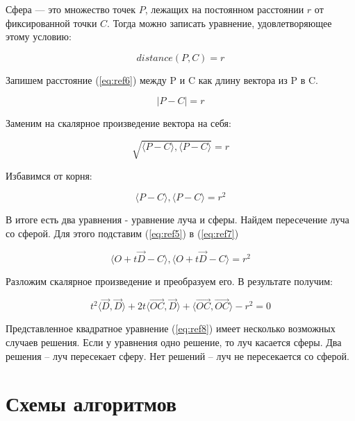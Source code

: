 Сфера — это множество точек $P$, лежащих на постоянном расстоянии $r$ от фиксированной точки $C$. Тогда можно записать уравнение, удовлетворяющее этому условию:

\begin{equation}
	distance(P,C) = r
	\label{eq:ref6}
\end{equation}

Запишем расстояние (\ref{eq:ref6}) между P и C как длину вектора из P в C.

\begin{equation}
	|P-C|=r
\end{equation}

Заменим на скалярное произведение вектора на себя:

\begin{equation}
	\sqrt{\langle P - C\rangle, \langle P - C\rangle} = r
\end{equation}

Избавимся от корня:

\begin{equation}
	\langle P - C\rangle, \langle P - C\rangle = r^2
	\label{eq:ref7}
\end{equation}

В итоге есть два уравнения - уравнение луча и сферы. Найдем пересечение луча со сферой. Для этого подставим (\ref{eq:ref5}) в (\ref{eq:ref7})

\begin{equation}
	\langle O + t\overrightarrow{D} - C \rangle, \langle O + t\overrightarrow{D} - C\rangle = r^2
\end{equation}

Разложим скалярное произведение и преобразуем его. В результате получим:

\begin{equation}
	t^2 \langle \overrightarrow{D}, \overrightarrow{D} \rangle + 2t \langle \overrightarrow{OC}, \overrightarrow{D} \rangle + \langle \overrightarrow{OC}, \overrightarrow{OC} \rangle -r^2 = 0
	\label{eq:ref8}
\end{equation}

Представленное квадратное уравнение (\ref{eq:ref8}) имеет несколько возможных случаев решения. Если у уравнения одно решение, то луч касается сферы. Два решения -- луч пересекает сферу. Нет решений -- луч не пересекается со сферой.

\newpage

\section{Схемы алгоритмов}

